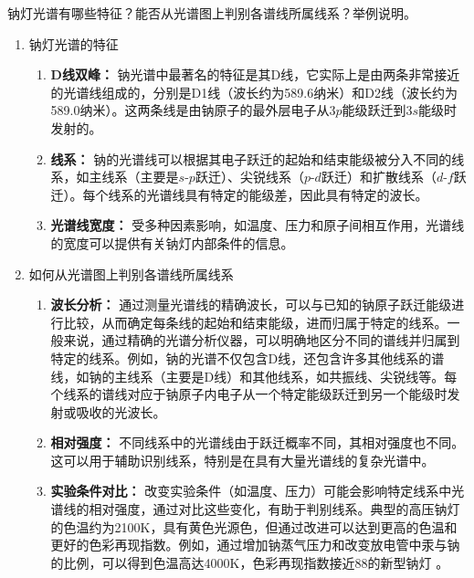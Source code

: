 \documentclass[dvipsnames, svgnames,a4paper,11pt]{article}
\begin{document}
	\begin{question}
		钠灯光谱有哪些特征？能否从光谱图上判别各谱线所属线系？举例说明。
	\end{question}
	\begin{enumerate}
		\item 钠灯光谱的特征
		\begin{enumerate}
			\item \textbf{D线双峰：} 钠光谱中最著名的特征是其D线，它实际上是由两条非常接近的光谱线组成的，分别是D1线（波长约为589.6纳米）和D2线（波长约为589.0纳米）。这两条线是由钠原子的最外层电子从$3p$能级跃迁到$3s$能级时发射的。
			
			\item \textbf{线系：} 钠的光谱线可以根据其电子跃迁的起始和结束能级被分入不同的线系，如主线系（主要是$s$-$p$跃迁）、尖锐线系（$p$-$d$跃迁）和扩散线系（$d$-$f$跃迁）。每个线系的光谱线具有特定的能级差，因此具有特定的波长。
			
			\item \textbf{光谱线宽度：} 受多种因素影响，如温度、压力和原子间相互作用，光谱线的宽度可以提供有关钠灯内部条件的信息。
		\end{enumerate}
		
		\item 如何从光谱图上判别各谱线所属线系
		\begin{enumerate}
			\item \textbf{波长分析：} 通过测量光谱线的精确波长，可以与已知的钠原子跃迁能级进行比较，从而确定每条线的起始和结束能级，进而归属于特定的线系。一般来说，通过精确的光谱分析仪器，可以明确地区分不同的谱线并归属到特定的线系。例如，钠的光谱不仅包含D线，还包含许多其他线系的谱线，如钠的主线系（主要是D线）和其他线系，如共振线、尖锐线等。每个线系的谱线对应于钠原子内电子从一个特定能级跃迁到另一个能级时发射或吸收的光波长。
			
			\item \textbf{相对强度：} 不同线系中的光谱线由于跃迁概率不同，其相对强度也不同。这可以用于辅助识别线系，特别是在具有大量光谱线的复杂光谱中。
			
			\item \textbf{实验条件对比：} 改变实验条件（如温度、压力）可能会影响特定线系中光谱线的相对强度，通过对比这些变化，有助于判别线系。典型的高压钠灯的色温约为2100K，具有黄色光源色，但通过改进可以达到更高的色温和更好的色彩再现指数。例如，通过增加钠蒸气压力和改变放电管中汞与钠的比例，可以得到色温高达4000K，色彩再现指数接近88的新型钠灯 。
		\end{enumerate}
		

\end{enumerate}
\end{document}
